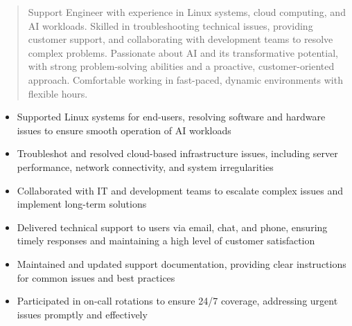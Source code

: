 



\makecvheader

\begin{quote}
  \noindent
  Support Engineer with experience in Linux systems, cloud computing, and AI workloads. Skilled in troubleshooting technical issues, providing customer support, and collaborating with development teams to resolve complex problems. Passionate about AI and its transformative potential, with strong problem-solving abilities and a proactive, customer-oriented approach. Comfortable working in fast-paced, dynamic environments with flexible hours.
\end{quote}

\par\smallskip
\noindent
\begin{minipage}{20cm}
  \begin{minipage}{9.75cm}
    \begin{itemize}
      \item Supported Linux systems for end-users, resolving software and hardware issues to ensure smooth operation of AI workloads
      \item Troubleshot and resolved cloud-based infrastructure issues, including server performance, network connectivity, and system irregularities
      \item Collaborated with IT and development teams to escalate complex issues and implement long-term solutions
    \end{itemize}
  \end{minipage}
  \hfill
  \begin{minipage}{9.75cm}
    \begin{itemize}
      \item Delivered technical support to users via email, chat, and phone, ensuring timely responses and maintaining a high level of customer satisfaction
      \item Maintained and updated support documentation, providing clear instructions for common issues and best practices
      \item Participated in on-call rotations to ensure 24/7 coverage, addressing urgent issues promptly and effectively
    \end{itemize}
  \end{minipage}
\end{minipage}
\par\smallskip
\divider

